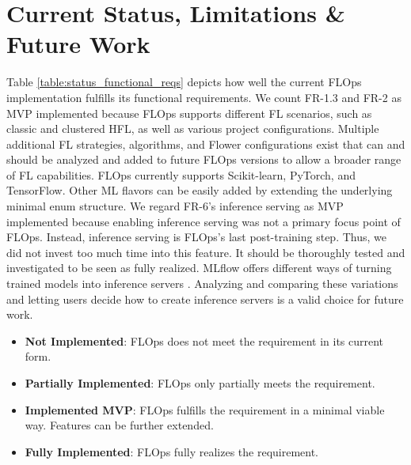 \section{Current Status, Limitations \& Future Work}

Table \ref{table:status_functional_reqs} depicts how well the current FLOps implementation fulfills its functional requirements.
We count FR-1.3 and FR-2 as MVP implemented because FLOps supports different FL scenarios, such as classic and clustered HFL, as well as various project configurations.
Multiple additional FL strategies, algorithms, and Flower configurations exist that can and should be analyzed and added to future FLOps versions to allow a broader range of FL capabilities.
FLOps currently supports Scikit-learn, PyTorch, and TensorFlow.
Other ML flavors can be easily added by extending the underlying minimal enum structure.
We regard FR-6's inference serving as MVP implemented because enabling inference serving was not a primary focus point of FLOps.
Instead, inference serving is FLOps's last post-training step.
Thus, we did not invest too much time into this feature.
It should be thoroughly tested and investigated to be seen as fully realized.
MLflow offers different ways of turning trained models into inference servers \cite{mlflow_inference_serving}.
Analyzing and comparing these variations and letting users decide how to create inference servers is a valid choice for future work.

\begin{itemize}
    \item [\faCircleO] \textbf{Not Implemented}: FLOps does not meet the requirement in its current form. 
	\item [\faDotCircleO] \textbf{Partially Implemented}: FLOps only partially meets the requirement.
	\item [\faArrowCircleRight] \textbf{Implemented MVP}: FLOps fulfills the requirement in a minimal viable way. Features can be further extended.
	\item [\faCircle] \textbf{Fully Implemented}: FLOps fully realizes the requirement.
\end{itemize}

\begin{figure}[p]
	
		
\end{figure}


